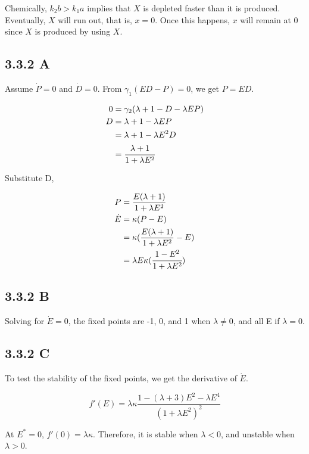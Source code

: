 \documentclass[]{article}
\begin{document}
	Chemically, $k_2b > k_1a$ implies that $X$ is depleted faster than it is produced. Eventually, $X$ will run out, that is, $x = 0$. Once this happens, $x$ will remain at $0$ since $X$ is produced by using $X$.
	
	\subsection*{3.3.2 A} Assume $\dot P = 0$ and $\dot D = 0$. From $\gamma_1(ED-P) = 0$, we get $P = ED$.
	
	\begin{align*}
	0 &= \gamma_2(\lambda + 1 - D - \lambda EP)\\
	D &= \lambda + 1 - \lambda EP\\
	&= \lambda + 1 - \lambda E^2 D\\
	&= \cfrac{\lambda  +  1}{1 + \lambda E^2}\\
	\end{align*}
	
	Substitute D,
	
	\begin{align*}
	P &= \frac{E(\lambda  +  1)}{1 + \lambda E^2}\\
	\dot E &= \kappa(P - E)\\
	&= \kappa(\frac{E(\lambda  +  1)}{1 + \lambda E^2} - E)\\
	&= \lambda E\kappa(\cfrac{1-E^2}{1 +  \lambda E^2})\\
	\end{align*}
	
	\subsection*{3.3.2 B} Solving for $\dot E = 0$, the fixed points are -1, 0, and 1 when $\lambda \neq 0$, and all E if $\lambda = 0$.
	
	
	\subsection*{3.3.2 C} To test the stability of the fixed points, we get the derivative of $\dot E$.
	
	\begin{equation*}
	f'(E) = \lambda\kappa \frac{1 - (\lambda + 3)E^2 - \lambda E^4}{(1 + \lambda E^2)^2}
	\end{equation*}
	
	At $E^* = 0$, $f'(0) = \lambda \kappa$. Therefore, it is stable when $\lambda < 0$, and unstable when $\lambda > 0$.\\
	
\end{document}
